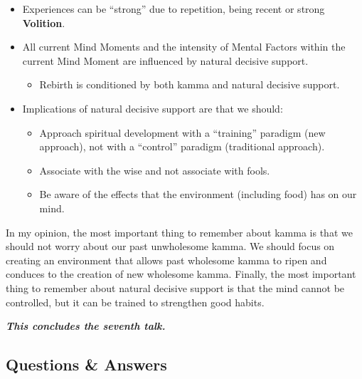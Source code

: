 \begin{itemize}
\begin{itemize}
\end{itemize}

\item Experiences can be “strong” due to repetition, being recent or strong \textbf{Volition}.

\item All current Mind Moments and the intensity of Mental Factors within the current Mind Moment are influenced by natural decisive support.

\begin{itemize}

\item Rebirth is conditioned by both kamma and natural decisive support.

\end{itemize}

\item Implications of natural decisive support are that we should:

\begin{itemize}

\item Approach spiritual development with a “training” paradigm (new approach), not with a “control” paradigm (traditional approach).

\item Associate with the wise and not associate with fools.

\item Be aware of the effects that the environment (including food) has on our mind.

\end{itemize}

\end{itemize}

In my opinion, the most important thing to remember about kamma is that we should not worry about our past unwholesome kamma. We should focus on creating an environment that allows past wholesome kamma to ripen and conduces to the creation of new wholesome kamma. Finally, the most important thing to remember about natural decisive support is that the mind cannot be controlled, but it can be trained to strengthen good habits.

\begin{center}
\textbf{\textit{This concludes the seventh talk.}} \\
\end{center}

\newpage

\subsection*{Questions \& Answers}

